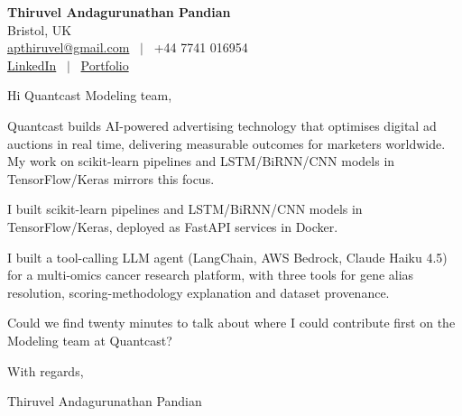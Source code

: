 \documentclass[11pt,a4paper]{article}
\begin{document}
\raggedright
\pagestyle{empty}

\begin{center}
    {\LARGE \color{linkblue} \textbf{Thiruvel Andagurunathan Pandian}}\\[0.2cm]
    Bristol, UK \\
    \href{mailto:apthiruvel@gmail.com}{apthiruvel@gmail.com} \ $|$ \ +44 7741 016954 \\
\href{https://www.linkedin.com/in/thiruvel-a-p/}{LinkedIn} \ $|$ \ \href{https://thiruvel-ap.github.io/PersonalPortfolio/}{Portfolio}
\end{center}

\vspace{0.4cm}

\noindent
Hi Quantcast Modeling team,

Quantcast builds AI-powered advertising technology that optimises digital ad auctions in real time, delivering measurable outcomes for marketers worldwide. My work on scikit-learn pipelines and LSTM/BiRNN/CNN models in TensorFlow/Keras mirrors this focus.

I built scikit-learn pipelines and LSTM/BiRNN/CNN models in TensorFlow/Keras, deployed as FastAPI services in Docker.

I built a tool-calling LLM agent (LangChain, AWS Bedrock, Claude Haiku 4.5) for a multi-omics cancer research platform, with three tools for gene alias resolution, scoring-methodology explanation and dataset provenance.

Could we find twenty minutes to talk about where I could contribute first on the Modeling team at Quantcast?

\vspace{0.5cm}

With regards,

Thiruvel Andagurunathan Pandian
\end{document}
